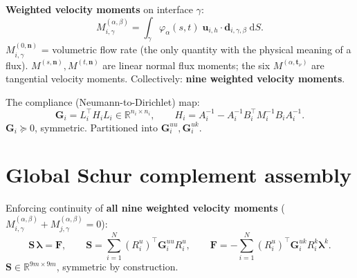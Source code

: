 \documentclass[11pt,a4paper]{article}
\newcommand{\R}{\mathbb{R}}
\newcommand{\vel}{\bm{u}}
\newcommand{\normal}{\bm{n}}
\newcommand{\trac}{\bm{\lambda}}
\newcommand{\DtN}{\mathbf{G}}
\newcommand{\Schur}{\mathbf{S}}
\begin{document}
\textbf{Weighted velocity moments} on interface $\gamma$:
\begin{equation}\label{eq:moment}
  M_{i,\gamma}^{(\alpha,\beta)}
  = \int_{\gamma} \varphi_\alpha(s,t)\;
    \vel_{i,h} \cdot \bm{d}_{i,\gamma,\beta} \;\mathrm{d}S.
\end{equation}
$M_{i,\gamma}^{(0,\normal)}$ = volumetric flow rate (the only quantity
with the physical meaning of a flux).  $M^{(s,\normal)},M^{(t,\normal)}$
are linear normal flux moments; the six $M^{(\alpha,\bm{t}_\nu)}$ are
tangential velocity moments.  Collectively: \textbf{nine weighted velocity
moments}.

The compliance (Neumann-to-Dirichlet) map:
\begin{equation}\label{eq:dtn}
  \DtN_i = L_i^\top H_i L_i \in \R^{n_i\times n_i},\qquad
  H_i = A_i^{-1} - A_i^{-1}B_i^\top M_i^{-1}B_i A_i^{-1}.
\end{equation}
$\DtN_i \succeq 0$, symmetric.  Partitioned into $\DtN_i^{uu},\DtN_i^{uk}$.

\section{Global Schur complement assembly}
\label{sec:global-affine}

Enforcing continuity of \textbf{all nine weighted velocity moments}
($M_{i,\gamma}^{(\alpha,\beta)} + M_{j,\gamma}^{(\alpha,\beta)} = 0$):
\begin{equation}\label{eq:schur}
  \Schur\,\trac = \bm{F},\qquad
  \Schur = \sum_{i=1}^N (R_i^u)^\top \DtN_i^{uu} R_i^u,\qquad
  \bm{F} = -\sum_{i=1}^N (R_i^u)^\top \DtN_i^{uk} R_i^k \trac^k.
\end{equation}
$\Schur \in \R^{9m\times 9m}$, symmetric by construction.
\end{document}
